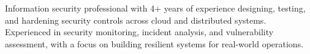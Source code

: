 




\vspace{6pt}

\begin{cvparagraph}
Information security professional with 4+ years of experience designing, testing, and hardening security controls across cloud and distributed systems. Experienced in security monitoring, incident analysis, and vulnerability assessment, with a focus on building resilient systems for real-world operations.
\end{cvparagraph}

\vspace{2mm}

